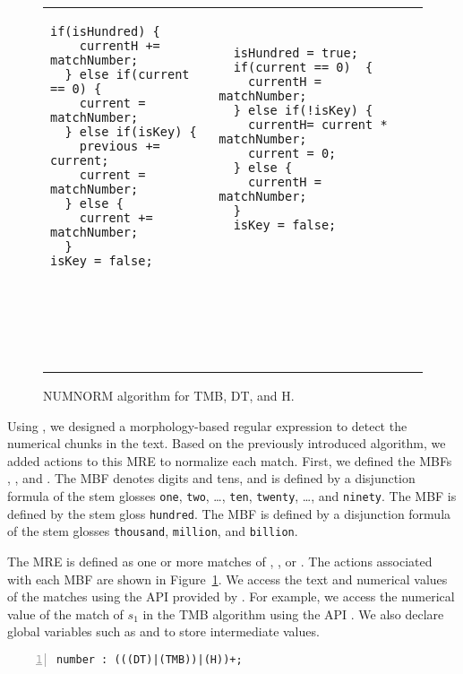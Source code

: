 \begin{appendices}
\begin{figure}[tb!]
\begin{tabular}{p{3.6cm}p{3.6cm}p{3.6cm}}
\begin{Verbatim}[fontsize=\relsize{-3},frame=single,label=DT algorithm]
  if(isHundred) {
    currentH += matchNumber;
  } else if(current == 0) {
    current = matchNumber;
  } else if(isKey) {
    previous += current;
    current = matchNumber;
  } else {
    current += matchNumber;
  }
isKey = false;







\end{Verbatim}
&
\begin{Verbatim}[fontsize=\relsize{-3},frame=single,label=H algorithm] 

  isHundred = true;
  if(current == 0)  {
    currentH = matchNumber;
  } else if(!isKey) {
    currentH= current * matchNumber;
    current = 0;
  } else {
    currentH = matchNumber;
  }
  isKey = false;
  
  
  
  
  
  
  
  
\end{Verbatim}
\\ 
\end{tabular}
\caption{NUMNORM algorithm for TMB, DT, and H.}
\label{fig:numnormalgo}
\end{figure}

Using \framework , we designed a morphology-based regular expression to detect the numerical chunks in the text. 
Based on the previously introduced algorithm, we added actions to this MRE to normalize each match. 
First, we defined the MBFs , , and . 
The MBF 
 denotes digits and tens, and is defined by a disjunction formula of the stem glosses 
{\tt one}, {\tt two}, \dots , {\tt ten}, {\tt twenty}, \dots , and {\tt ninety}. 
The MBF  is defined by the stem gloss {\tt hundred}. 
The MBF  is defined by a disjunction formula of the stem glosses {\tt thousand}, {\tt million}, and {\tt billion}.

The  MRE is defined as one or more matches of , , or . 
The actions associated with each MBF are shown in Figure~\ref{fig:numnormalgo}.
We access the text and numerical values of the matches using the API provided by \framework. 
For example, we access the numerical value of the match of $s_1$ in the TMB algorithm using the API . 
We also declare global variables such as  and  to store intermediate values.

\begin{Verbatim}[numbers=left]
number : (((DT)|(TMB))|(H))+;
\end{Verbatim}


\end{appendices}
